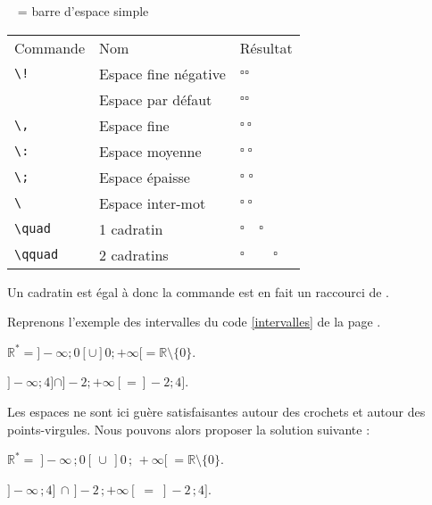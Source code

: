 \begin{center}
\verb*! ! = barre d'espace simple\par\medskip

	\begin{tabular}{lll}

		\rowcolor{gray!50} Commande & Nom & Résultat  \\
        \verb+\!+ & Espace fine négative & $\square \! \square$\\
        \verb*! ! & Espace par défaut & $\square \square$\\
        \verb+\,+ & Espace fine & $\square \, \square$\\
        \verb+\:+ & Espace moyenne & $\square \: \square$\\
        \verb+\;+ & Espace épaisse & $\square \; \square$\\
        \verb*+\ + & Espace inter-mot & $\square \ \square$\\
        \verb+\quad+ & 1 cadratin & $\square \quad \square$\\
        \verb+\qquad+ & 2 cadratins & $\square \qquad \square$\\
	\end{tabular}
\end{center}

\begin{info}
    Un cadratin est égal à \ordi{1em} donc la commande  est en fait un raccourci de .
\end{info}

Reprenons l'exemple des intervalles du code \ref{intervalles} de la page \pageref{intervalles}.\bigskip

{\NewFont
\begin{SideBySideExample}
    $\mathds R^*=]-\infty ; 0[ \cup ]0 ; +\infty[ =
    \mathds R \setminus \{0\}$.\par\medskip
    $]-\infty ; 4] \cap ]-2 ; +\infty[ = ]-2 ; 4]$.
\end{SideBySideExample}
}\bigskip

Les espaces ne sont ici guère satisfaisantes autour des crochets et autour des points-virgules. Nous pouvons alors proposer la solution suivante :\bigskip

{\NewFont
\begin{SideBySideExample}
    $\mathds R^*=\; ]-\infty\, ; 0[\, \cup\,
                    ]0\, ;\, +\infty[\;
    =\mathds R \setminus \{0\}$.\par\medskip
    $]-\infty\, ; 4]\, \cap\, ]-2\, ; +\infty[ \;
    =\; ]-2\, ; 4]$.
\end{SideBySideExample}
}\bigskip

